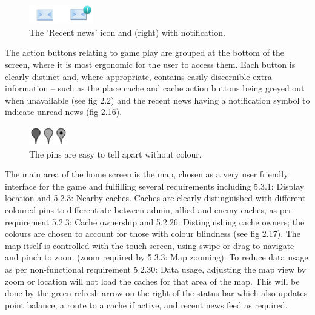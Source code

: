 \begin{figure}
	\vspace{-45pt}
	\begin{center}
	\includegraphics[width=0.25\textwidth]{images/news_icons}
	\caption{The 'Recent news' icon and (right) with notification.}
	\label{news_icons}
	\end{center}
	\vspace{15pt}
\end{figure}

The action buttons relating to game play are grouped at the bottom of the screen, where it is most ergonomic for the user to access them. Each button is clearly distinct and, where appropriate, contains easily discernible extra information – such as the place cache and cache action buttons being greyed out when unavailable (see fig 2.2) and the recent news having a notification symbol to indicate unread news (fig 2.16). 

\begin{figure}
	\vspace{-20pt}
	\begin{center}
	\includegraphics[width=0.15\textwidth]{images/grey_pins}
	\caption{The pins are easy to tell apart without colour.}
	\label{grey_pins}
	\end{center}
	\vspace{-20pt}
\end{figure}

The main area of the home screen is the map, chosen as a very user friendly interface for the game and fulfilling several requirements including 5.3.1: Display location and 5.2.3: Nearby caches. Caches are clearly distinguished with different coloured pins to differentiate between admin, allied and enemy caches, as per requirement 5.2.3: Cache ownership and 5.2.26: Distinguishing cache owners; the colours are chosen to account for those with colour blindness (see fig 2.17). The map itself is controlled with the touch screen, using swipe or drag to navigate and pinch to zoom (zoom required by 5.3.3: Map zooming). To reduce data usage as per non-functional requirement 5.2.30: Data usage, adjusting the map view by zoom or location will not load the caches for that area of the map. This will be done by the green refresh arrow on the right of the status bar which also updates point balance, a route to a cache if active, and recent news feed as required.

